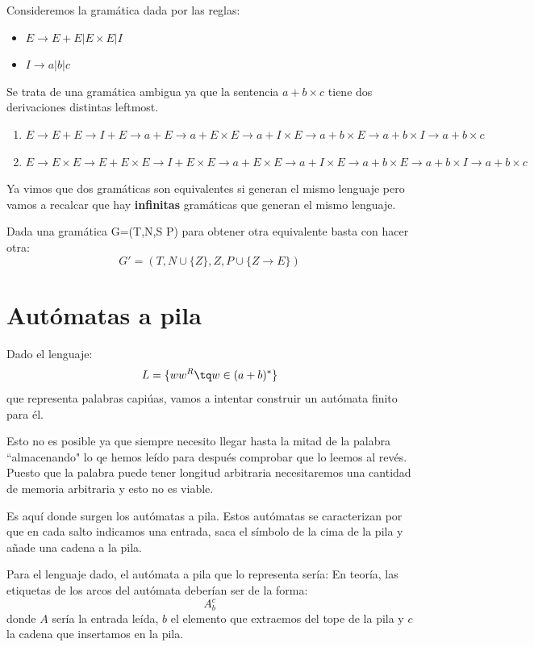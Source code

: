\documentclass{apuntes}
\begin{document}
\begin{example}
Consideremos la gramática dada por las reglas:
\begin{itemize}
\item $E \rightarrow E + E | E \times E | I$
\item $I \rightarrow a | b | c$
\end{itemize}

Se trata de una gramática ambigua ya que la sentencia $a+b\times c$ tiene dos derivaciones distintas leftmost.
\begin{enumerate}
\item $E \rightarrow E + E \rightarrow I + E \rightarrow a + E \rightarrow a + E \times E \rightarrow a + I \times E \rightarrow a + b \times E \rightarrow a + b \times I \rightarrow a + b \times c$
\item $E \rightarrow E \times E \rightarrow E + E \times E \rightarrow I + E \times E \rightarrow a + E \times E \rightarrow a + I \times E \rightarrow a+b \times E \rightarrow a + b \times I \rightarrow a + b \times c$
\end{enumerate}
\end{example}

Ya vimos que dos gramáticas son equivalentes si generan el mismo lenguaje pero vamos a recalcar que hay \textbf{infinitas} gramáticas que generan el mismo lenguaje. 

Dada una gramática G=(T,N,S P) para obtener otra equivalente basta con hacer otra:
\[G' =(T, N \cup \lbrace Z \rbrace, Z, P \cup \lbrace Z \rightarrow E \rbrace)\]

\chapter{Autómatas a pila}
Dado el lenguaje:
\[L=\lbrace ww^R \tq w \in (a+b)^*\rbrace\]
que representa palabras capiúas, vamos a intentar construir un autómata finito para él.

Esto no es posible ya que siempre necesito llegar hasta la mitad de la palabra ``almacenando" lo qe hemos leído para después comprobar que lo leemos al revés. Puesto que la palabra puede tener longitud arbitraria necesitaremos una cantidad de memoria arbitraria y esto no es viable.

Es aquí donde surgen los autómatas a pila. Estos autómatas se caracterizan por que en cada salto indicamos una entrada, saca el símbolo de la cima de la pila y añade una cadena a la pila.

Para el lenguaje dado, el autómata a pila que lo representa sería:
En teoría, las etiquetas de los arcos del autómata deberían ser de la forma:
\[A_b^c\]
donde $A$ sería la entrada leída, $b$ el elemento que extraemos del tope de la pila y $c$ la cadena que insertamos en la pila.
\end{document}

